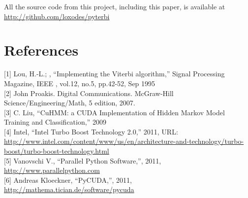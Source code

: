 \documentclass[journal,onecolumn]{IEEEtran}
\begin{document}
All the source code from this project, including this paper, is available at \url{http://github.com/loxodes/pyterbi}

\section*{References}
        [1] Lou, H.-L.; , ``Implementing the Viterbi algorithm,'' Signal Processing Magazine, IEEE , vol.12, no.5, pp.42-52, Sep 1995 \\

        [2] John Proakis. Digital Communications. McGraw-Hill Science/Engineering/Math, 5 edition, 2007. \\

        [3] C. Liu, ``CuHMM: a CUDA Implementation of Hidden Markov Model Training and Classification,'' 2009 \\

        [4] Intel, ``Intel Turbo Boost Technology 2.0,'' 2011, URL: \url{http://www.intel.com/content/www/us/en/architecture-and-technology/turbo-boost/turbo-boost-technology.html}\\

        [5] Vanovschi V., ``Parallel Python Software,'', 2011, \url{http://www.parallelpython.com}\\

        [6] Andreas Kloeckner, ``PyCUDA,'', 2011, \url{http://mathema.tician.de/software/pycuda}\\
\end{document}

